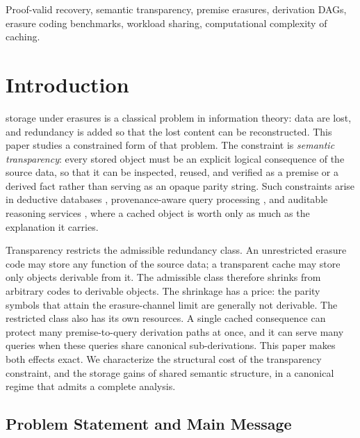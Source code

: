 \documentclass[journal]{IEEEtran}
\numberwithin{equation}{section}
\begin{document}
\begin{IEEEkeywords}
Proof-valid recovery, semantic transparency, premise erasures, derivation
DAGs, erasure coding benchmarks, workload sharing, computational complexity
of caching.
\end{IEEEkeywords}

\section{Introduction}
\label{sec:introduction}

 storage under erasures is a classical problem in
information theory: data are lost, and redundancy is added so that the lost
content can be reconstructed.  This paper studies a constrained form of that
problem.  The constraint is \emph{semantic transparency}: every stored object
must be an explicit logical consequence of the source data, so that it can be
inspected, reused, and verified as a premise or a derived fact rather than
serving as an opaque parity string.  Such constraints arise in deductive
databases \cite{abiteboul1995foundations,ullman1988database}, provenance-aware
query processing
\cite{green2007provenance,cheney2009provenance,sikos2020provenance}, and
auditable reasoning services \cite{raza2025responsible,liu2026algebraic},
where a cached object is worth only as much as the explanation it carries.

Transparency restricts the admissible redundancy class.  An unrestricted
erasure code may store any function of the source data; a transparent cache
may store only objects derivable from it.  The admissible class therefore
shrinks from arbitrary codes to derivable objects.  The shrinkage has a
price: the parity symbols that attain the erasure-channel limit are generally
not derivable.  The restricted class also has its own resources.  A single
cached consequence can protect many premise-to-query derivation paths at
once, and it can serve many queries when these queries share canonical
sub-derivations.  This paper makes both effects exact.  We characterize the
structural cost of the transparency constraint, and the storage gains of
shared semantic structure, in a canonical regime that admits a complete
analysis.

\subsection{Problem Statement and Main Message}
\label{subsec:problem-statement}
\end{document}
